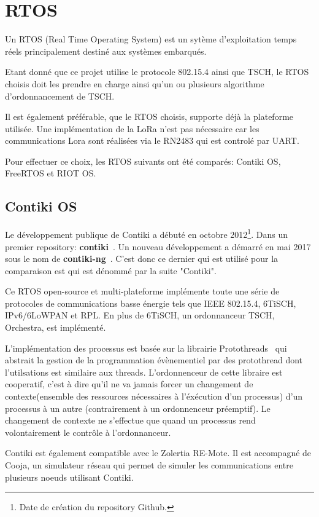 \section{RTOS}

Un RTOS (Real Time Operating System) est un sytème d'exploitation temps réels principalement destiné aux systèmes embarqués.

Etant donné que ce projet utilise le protocole 802.15.4 ainsi que TSCH, le RTOS choisis doit les prendre en charge ainsi qu'un ou plusieurs algorithme d'ordonnancement de TSCH.

Il est également préférable, que le RTOS choisis, supporte déjà la plateforme utilisée. Une implémentation de la LoRa n'est pas nécessaire car les communications Lora sont réalisées via le RN2483 qui est controlé par UART.

Pour effectuer ce choix, les RTOS suivants ont été comparés: Contiki OS, FreeRTOS et RIOT OS.

\subsection*{Contiki OS}
    Le développement publique de Contiki a débuté en octobre 2012\footnote{Date de création du repository Github.}. Dans un premier repository: \textbf{contiki}~\cite{contiki-repo:old}. Un nouveau développement a démarré en mai 2017 sous le nom de \textbf{contiki-ng}~\cite{contiki-repo:ng}. C'est donc ce dernier qui est utilisé pour la comparaison est qui est dénommé par la suite "Contiki".

    Ce RTOS open-source et multi-plateforme implémente toute une série de protocoles de communications basse énergie tels que IEEE 802.15.4, 6TiSCH, IPv6/6LoWPAN et RPL. En plus de 6TiSCH, un ordonnanceur TSCH, Orchestra, est implémenté.

    L'implémentation des processus est basée sur la librairie Protothreads~\cite{paper:protothreads}
    qui abstrait la gestion de la programmation évènementiel par des protothread dont l'utilsations est similaire aux threads. L'ordonnenceur de cette libraire est cooperatif, c'est à dire qu'il ne va jamais forcer un changement de contexte(ensemble des ressources nécessaires à l'éxécution d'un processus) d'un processus à un autre (contrairement à un ordonnenceur préemptif). Le changement de contexte ne s'effectue que quand un processus rend volontairement le contrôle à l'ordonnanceur.
    
    Contiki est également compatible avec le Zolertia RE-Mote. Il est accompagné de Cooja, un simulateur réseau qui permet de simuler les communications entre plusieurs noeuds utilisant Contiki.

